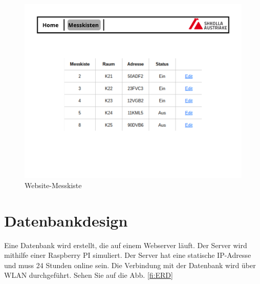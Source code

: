 	\begin{figure}[ht]
		\centering
		\includegraphics[scale=0.4]{./bilder/Page_2.png}
		\caption{Website-Messkiste}
		\label{fi:Web2}
	\end{figure} 
	\section{Datenbankdesign}
	Eine Datenbank wird erstellt, die auf einem Webserver l\"auft. Der Server wird mithilfe einer Raspberry PI simuliert. Der Server hat eine statische IP-Adresse und muss 24 Stunden online sein. Die Verbindung mit der Datenbank wird \"uber WLAN durchgef\"uhrt. Sehen Sie auf die Abb. \ref{fi:ERD}
